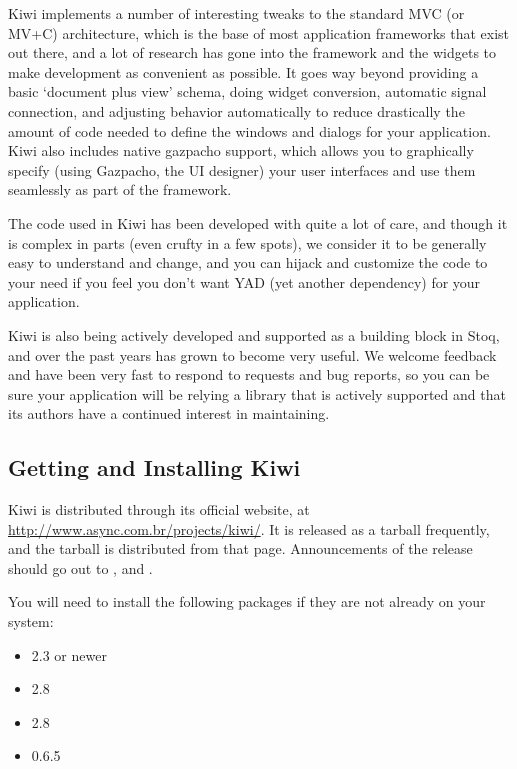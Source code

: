 \documentclass[a4paper]{howto}
\begin{document}
Kiwi implements a number of interesting tweaks to the standard MVC (or
MV+C) architecture, which is the base of most application frameworks
that exist out there, and a lot of research has gone into the framework
and the widgets to make development as convenient as possible. It goes
way beyond providing a basic `document plus view' schema, doing widget
conversion, automatic signal connection, and adjusting behavior
automatically to reduce drastically the amount of code needed to define
the windows and dialogs for your application. Kiwi also includes native
gazpacho support, which allows you to graphically specify (using
Gazpacho, the UI designer) your user interfaces and use them seamlessly
as part of the framework.

The code used in Kiwi has been developed with quite a lot of care, and
though it is complex in parts (even crufty in a few spots), we consider
it to be generally easy to understand and change, and you can hijack and
customize the code to your need if you feel you don't want YAD (yet
another dependency) for your application.

Kiwi is also being actively developed and supported as a building block
in Stoq, and over the past years has grown to become very useful.
We welcome feedback and have been very fast to respond to requests and
bug reports, so you can be sure your application will be relying a
library that is actively supported and that its authors have a
continued interest in maintaining.

\subsection{Getting and Installing Kiwi}

Kiwi is distributed through its official website, at
\url{http://www.async.com.br/projects/kiwi/}. It is released as a
tarball frequently, and the tarball is distributed from that page.
Announcements of the release should go out to ,
 and .

You will need to install the following packages if they are not
already on your system:

\begin{itemize}
  \item  {} 2.3 or newer
  \item  {} 2.8
  \item  {} 2.8
  \item  {} 0.6.5
\end{itemize}
\end{document}
